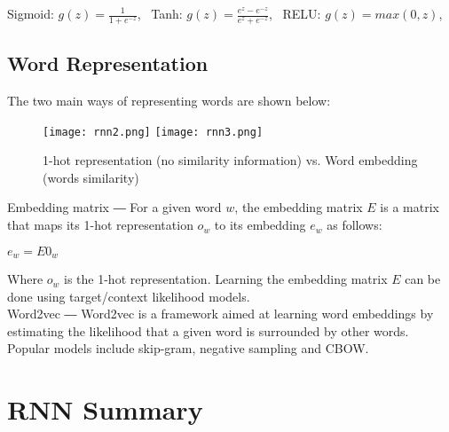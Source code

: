 \documentclass[10pt, oneside]{article}   	%
\begin{document}
\begin{center}
Sigmoid: $g(z) = \frac{1}{1+e^{-z}}$, \
Tanh: $g(z) = \frac{e^z - e^{-z}}{e^z + e^{-z}}$, \
RELU: $g(z) = max(0,z)$, \
\end{center}

\subsection{Word Representation}

The two main ways of representing words are shown below:

\begin{figure}[h] %
   \centering
   \texttt{[image: rnn2.png]} 
     \texttt{[image: rnn3.png]} 
   \caption{1-hot representation (no similarity information) vs. Word embedding (words similarity)}
\end{figure}

\FloatBarrier

Embedding matrix ― For a given word $w$, the embedding matrix $E$ is a matrix that maps its 1-hot representation $o_w$ to its embedding $e_w$ as follows: 

 \begin{center}
 
 $e_w = E0_w$
 
 \end{center}
 
 Where $o_w$ is the 1-hot representation. Learning the embedding matrix $E$ can be done using target/context likelihood models.\\
 
 Word2vec ― Word2vec is a framework aimed at learning word embeddings by estimating the likelihood that a given word is surrounded by other words. Popular models include skip-gram, negative sampling and CBOW.
 
\section*{RNN Summary}\
\end{document}
